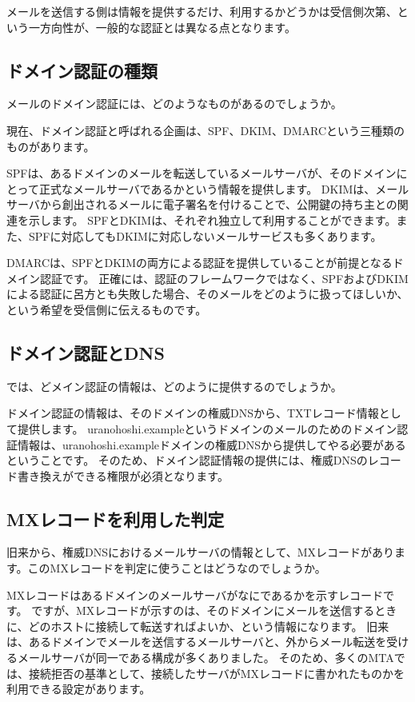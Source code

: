 メールを送信する側は情報を提供するだけ、利用するかどうかは受信側次第、という一方向性が、一般的な認証とは異なる点となります。

\subsection{ドメイン認証の種類}

メールのドメイン認証には、どのようなものがあるのでしょうか。

現在、ドメイン認証と呼ばれる企画は、SPF、DKIM、DMARCという三種類のものがあります。

SPFは、あるドメインのメールを転送しているメールサーバが、そのドメインにとって正式なメールサーバであるかという情報を提供します。 
DKIMは、メールサーバから創出されるメールに電子署名を付けることで、公開鍵の持ち主との関連を示します。 
SPFとDKIMは、それぞれ独立して利用することができます。また、SPFに対応してもDKIMに対応しないメールサービスも多くあります。

DMARCは、SPFとDKIMの両方による認証を提供していることが前提となるドメイン認証です。
正確には、認証のフレームワークではなく、SPFおよびDKIMによる認証に呂方とも失敗した場合、そのメールをどのように扱ってほしいか、という希望を受信側に伝えるものです。

\subsection{ドメイン認証とDNS}

では、どメイン認証の情報は、どのように提供するのでしょうか。

ドメイン認証の情報は、そのドメインの権威DNSから、TXTレコード情報として提供します。
uranohoshi.exampleというドメインのメールのためのドメイン認証情報は、uranohoshi.exampleドメインの権威DNSから提供してやる必要があるということです。
そのため、ドメイン認証情報の提供には、権威DNSのレコード書き換えができる権限が必須となります。

\subsection{MXレコードを利用した判定}

旧来から、権威DNSにおけるメールサーバの情報として、MXレコードがあります。このMXレコードを判定に使うことはどうなのでしょうか。

MXレコードはあるドメインのメールサーバがなにであるかを示すレコードです。
ですが、MXレコードが示すのは、そのドメインにメールを送信するときに、どのホストに接続して転送すればよいか、という情報になります。
旧来は、あるドメインでメールを送信するメールサーバと、外からメール転送を受けるメールサーバが同一である構成が多くありました。
そのため、多くのMTAでは、接続拒否の基準として、接続したサーバがMXレコードに書かれたものかを利用できる設定があります。

